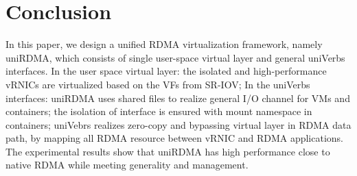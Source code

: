
\section{Conclusion}
In this paper, we design a unified RDMA virtualization framework, namely uniRDMA, which consists of single user-space virtual layer and general uniVerbs interfaces. In the user space virtual layer: the isolated and high-performance vRNICs are virtualized based on the VFs from SR-IOV; In the uniVerbs interfaces: uniRDMA uses shared files to realize general I/O channel for VMs and containers; the isolation of interface is ensured with mount namespace in containers; uniVebrs realizes zero-copy and bypassing virtual layer in RDMA data path, by mapping all RDMA resource between vRNIC and RDMA applications. The experimental results show that uniRDMA has high performance close to native RDMA while meeting generality and management.
